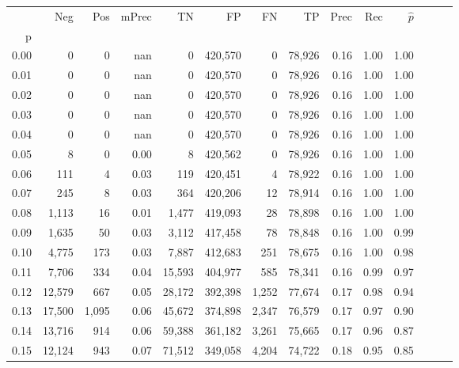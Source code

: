 \begin{tabular}{rrrrrrrrrrrrrr}
\toprule
{} &     Neg &    Pos & mPrec &       TN &       FP &      FN &      TP &  Prec &   Rec & $\hat{p}$ \\
p    &         &        &       &          &          &         &         &       &       &           \\
\midrule
0.00 &       0 &      0 &   nan &        0 &  420,570 &       0 &  78,926 &  0.16 &  1.00 &      1.00 \\
0.01 &       0 &      0 &   nan &        0 &  420,570 &       0 &  78,926 &  0.16 &  1.00 &      1.00 \\
0.02 &       0 &      0 &   nan &        0 &  420,570 &       0 &  78,926 &  0.16 &  1.00 &      1.00 \\
0.03 &       0 &      0 &   nan &        0 &  420,570 &       0 &  78,926 &  0.16 &  1.00 &      1.00 \\
0.04 &       0 &      0 &   nan &        0 &  420,570 &       0 &  78,926 &  0.16 &  1.00 &      1.00 \\
0.05 &       8 &      0 &  0.00 &        8 &  420,562 &       0 &  78,926 &  0.16 &  1.00 &      1.00 \\
0.06 &     111 &      4 &  0.03 &      119 &  420,451 &       4 &  78,922 &  0.16 &  1.00 &      1.00 \\
0.07 &     245 &      8 &  0.03 &      364 &  420,206 &      12 &  78,914 &  0.16 &  1.00 &      1.00 \\
0.08 &   1,113 &     16 &  0.01 &    1,477 &  419,093 &      28 &  78,898 &  0.16 &  1.00 &      1.00 \\
0.09 &   1,635 &     50 &  0.03 &    3,112 &  417,458 &      78 &  78,848 &  0.16 &  1.00 &      0.99 \\
0.10 &   4,775 &    173 &  0.03 &    7,887 &  412,683 &     251 &  78,675 &  0.16 &  1.00 &      0.98 \\
0.11 &   7,706 &    334 &  0.04 &   15,593 &  404,977 &     585 &  78,341 &  0.16 &  0.99 &      0.97 \\
0.12 &  12,579 &    667 &  0.05 &   28,172 &  392,398 &   1,252 &  77,674 &  0.17 &  0.98 &      0.94 \\
0.13 &  17,500 &  1,095 &  0.06 &   45,672 &  374,898 &   2,347 &  76,579 &  0.17 &  0.97 &      0.90 \\
0.14 &  13,716 &    914 &  0.06 &   59,388 &  361,182 &   3,261 &  75,665 &  0.17 &  0.96 &      0.87 \\
0.15 &  12,124 &    943 &  0.07 &   71,512 &  349,058 &   4,204 &  74,722 &  0.18 &  0.95 &      0.85 \\

\end{tabular}
